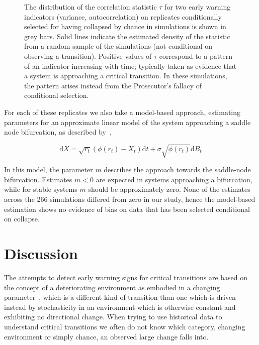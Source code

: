 \documentclass[authoryear,review,12pt]{elsarticle}
\newcommand{\ud}{\mathrm{d}}
\newif\ifhavefigures
\begin{document}
\begin{figure}
  \begin{center}
    \ifhavefigures
    \fi
  \end{center}
  \caption{The distribution of the correlation statistic $\tau$ for two
  early warning indicators (variance, autocorrelation) on replicates
  conditionally selected for having collapsed by chance in simulations
  is shown in grey bars.  Solid lines indicate the estimated density of
  the statistic from a random sample of the simulations (not conditional
  on observing a transition). Positive values of $\tau$ correspond to
  a pattern of an indicator increasing with time; typically taken as
  evidence that a system is approaching a critical transition.  In these
  simulations, the pattern arises instead from the Prosecutor's fallacy
  of conditional selection.}
  \label{fig:indicator}
\end{figure}


For each of these replicates we also take a model-based
approach, estimating parameters for an approximate linear
model of the system approaching a saddle node bifurcation, as
described by~\citet{Boettiger2012b},


\begin{equation}
\ud X = \sqrt{ r_t } (\phi(r_t) - X_t)\ud t + \sigma\sqrt{\phi(r_t) } \ud B_t \label{LSN}
\end{equation}


In this model, the parameter $m$
describes the approach towards the saddle-node bifurcation.  Estimates
$m < 0 $ are expected in systems approaching a bifurcation, while for
stable systems $m$ should be approximately zero. None of the estimates
across the 266 simulations differed from zero in our study, hence the
model-based estimation shows no evidence of bias on data that has been
selected conditional on collapse.



\section{Discussion}


The attempts to detect early warning signs for critical transitions
are based on the concept of a deteriorating environment as embodied
in a changing parameter~\cite{Scheffer2009}, which is a different kind
of transition than one which is driven instead by stochasticity in an
environment which is otherwise constant and exhibiting no directional
change. When trying to use historical data to understand critical
transitions we often do not know which category, changing environment
or simply chance, an observed large change falls into.
\end{document}
